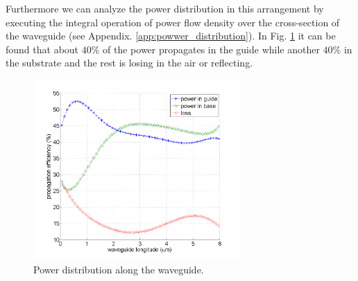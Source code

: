 Furthermore we can analyze the power distribution in this arrangement by executing the integral operation of power flow density over the cross-section of the waveguide (see Appendix. \ref{app:powwer_distribution}).  In Fig. \ref{fig:power_distribution} it can be found that about $40\%$ of the power propagates in the guide while another $40\%$ in the substrate and the rest is losing in the air or reflecting.
\begin{figure}[!ht]
\centering
\includegraphics[width=0.7\textwidth]{bilder/power_distribution1}
\caption{Power distribution along the waveguide.}
\label{fig:power_distribution}
\end{figure}
